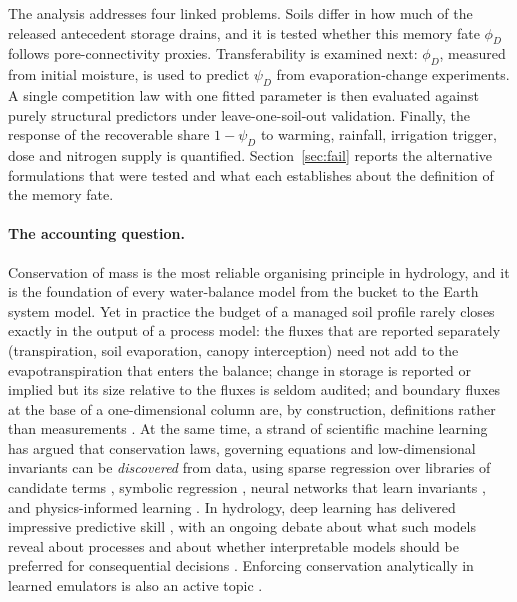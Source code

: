 \documentclass[preprint,12pt,authoryear]{elsarticle}
\begin{document}
The analysis addresses four linked problems. Soils differ in how much of the released antecedent storage drains, and it is tested whether this memory fate $\phi_D$ follows pore-connectivity proxies. Transferability is examined next: $\phi_D$, measured from initial moisture, is used to predict $\psi_D$ from evaporation-change experiments. A single competition law with one fitted parameter is then evaluated against purely structural predictors under leave-one-soil-out validation. Finally, the response of the recoverable share $1-\psi_D$ to warming, rainfall, irrigation trigger, dose and nitrogen supply is quantified. Section~\ref{sec:fail} reports the alternative formulations that were tested and what each establishes about the definition of the memory fate.


\paragraph{The accounting question.} Conservation of mass is the most reliable organising principle in hydrology, and it is the foundation of every water-balance model from the bucket to the Earth system model. Yet in practice the budget of a managed soil profile rarely closes exactly in the output of a process model: the fluxes that are reported separately (transpiration, soil evaporation, canopy interception) need not add to the evapotranspiration that enters the balance; change in storage is reported or implied but its size relative to the fluxes is seldom audited; and boundary fluxes at the base of a one-dimensional column are, by construction, definitions rather than measurements \citep{Hillel1998,Refsgaard2004}. At the same time, a strand of scientific machine learning has argued that conservation laws, governing equations and low-dimensional invariants can be \emph{discovered} from data, using sparse regression over libraries of candidate terms \citep{Brunton2016,Champion2019,deSilva2020}, symbolic regression \citep{Schmidt2009,Udrescu2020}, neural networks that learn invariants \citep{Iten2020,Liu2021}, and physics-informed learning \citep{Raissi2019,Karniadakis2021}. In hydrology, deep learning has delivered impressive predictive skill \citep{Kratzert2018,Kratzert2019,Shen2018}, with an ongoing debate about what such models reveal about processes \citep{Nearing2021,Reichstein2019} and about whether interpretable models should be preferred for consequential decisions \citep{Rudin2019}. Enforcing conservation analytically in learned emulators is also an active topic \citep{Beucler2021}.
\end{document}
